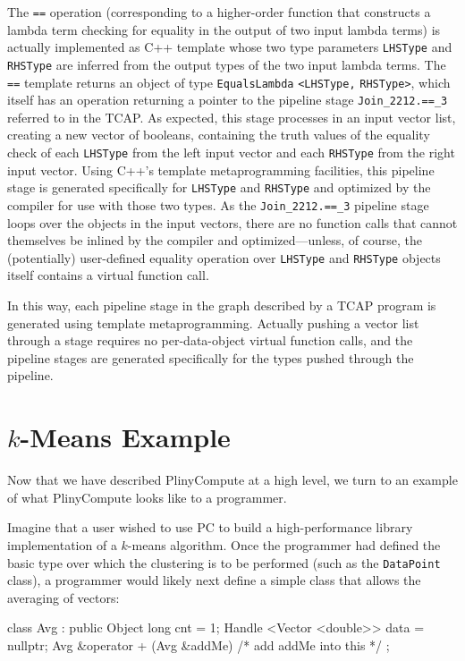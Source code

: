 \noindent The \texttt{==} 
operation (corresponding to a higher-order function that
constructs a lambda term checking for equality in the output of two input lambda terms) is actually implemented as C++ template
whose two type parameters \texttt{LHSType} and \texttt{RHSType} are inferred from
the output types of the two input lambda terms. 
The \texttt{==} template returns an object of type \texttt{EqualsLambda} \texttt{<LHSType,} \texttt{RHSType>}, which
itself has an operation returning a pointer to the pipeline stage \texttt{Join\_2212.==\_3} referred to in the TCAP.
As expected, this stage processes in an input vector list,
creating a new vector of booleans, containing the truth values of the equality check of each \texttt{LHSType} from the left
input vector and each \texttt{RHSType} from the right input vector.
Using C++'s template metaprogramming facilities, this 
pipeline stage is generated specifically for \texttt{LHSType} and \texttt{RHSType} and optimized by the compiler for use with those
two types.  As the \texttt{Join\_2212.==\_3} pipeline stage loops over the objects in the input vectors, 
there are no function calls that cannot themselves be inlined by the compiler
and optimized---unless, of course, the (potentially) user-defined equality operation over \texttt{LHSType} and \texttt{RHSType}
objects itself contains a virtual function call.

In this way, each pipeline stage in the graph described by a TCAP program is generated using template metaprogramming.
Actually pushing a vector list through a stage requires no per-data-object virtual function calls, and the pipeline stages
are generated specifically for the types pushed through the pipeline.

\section{$k$-Means Example}

Now that we have described PlinyCompute at a high level, we turn to an example of what PlinyCompute looks like to a programmer.

Imagine that a user wished to use PC to build a high-performance library implementation of a $k$-means algorithm.
Once the programmer had defined the basic type over which the clustering is to be performed (such as the
\texttt{DataPoint} class), 
a programmer would likely next define a simple class that allows the averaging of vectors:

\begin{code}
class Avg : public Object {
	long cnt = 1;
	Handle <Vector <double>> data = nullptr;
	Avg &operator + (Avg &addMe) {/* add addMe into this */}
};
\end{code}

